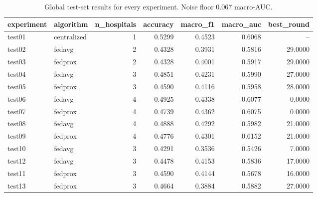 \begin{table}
\caption{Global test-set results for every experiment. Noise floor 0.067 macro-AUC.}
\label{tab:main-results}
\begin{tabular}{llrrrrr}
\toprule
experiment & algorithm & n_hospitals & accuracy & macro_f1 & macro_auc & best_round \\
\midrule
test01 & centralized & 1 & 0.5299 & 0.4523 & 0.6068 & -- \\
test02 & fedavg & 2 & 0.4328 & 0.3931 & 0.5816 & 29.0000 \\
test03 & fedprox & 2 & 0.4328 & 0.4001 & 0.5917 & 29.0000 \\
test04 & fedavg & 3 & 0.4851 & 0.4231 & 0.5990 & 27.0000 \\
test05 & fedprox & 3 & 0.4590 & 0.4116 & 0.5958 & 28.0000 \\
test06 & fedavg & 4 & 0.4925 & 0.4338 & 0.6077 & 0.0000 \\
test07 & fedprox & 4 & 0.4739 & 0.4362 & 0.6075 & 0.0000 \\
test08 & fedavg & 4 & 0.4888 & 0.4292 & 0.5982 & 21.0000 \\
test09 & fedprox & 4 & 0.4776 & 0.4301 & 0.6152 & 21.0000 \\
test10 & fedavg & 3 & 0.4291 & 0.3536 & 0.5426 & 7.0000 \\
test12 & fedavg & 3 & 0.4478 & 0.4153 & 0.5836 & 17.0000 \\
test11 & fedprox & 3 & 0.4590 & 0.4144 & 0.5678 & 16.0000 \\
test13 & fedprox & 3 & 0.4664 & 0.3884 & 0.5882 & 27.0000 \\
\bottomrule
\end{tabular}
\end{table}
